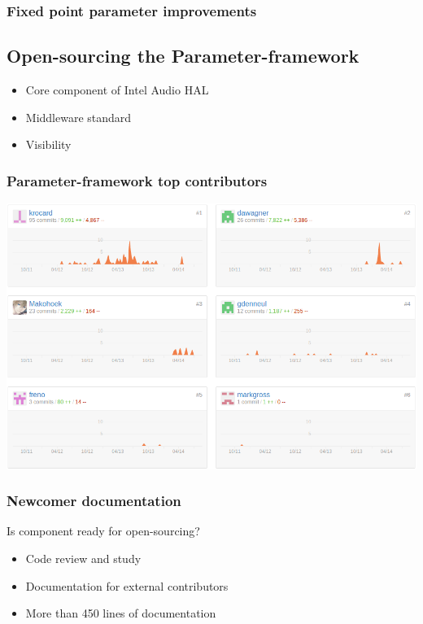 \begin{frame}
    \frametitle{Fixed point parameter improvements}
\end{frame}

\subsection{Open-sourcing the Parameter-framework}
\begin{FrameWithSubSection}
    \begin{itemize}
        \item Core component of Intel Audio HAL
        \item Middleware standard
        \item Visibility
    \end{itemize}
\end{FrameWithSubSection}

\begin{FrameWithSubSection}
    \frametitle{Parameter-framework top contributors}
    \centering
    \includegraphics[width=\textwidth]{../../report/src/img/statsGitHub.png}
\end{FrameWithSubSection}


\begin{FrameWithSubSection}
    \frametitle{Newcomer documentation}
    \centering
    \begin{block}{Is component ready for open-sourcing?}
        \begin{itemize}
            \item Code review and study
            \item Documentation for external contributors
            \item More than 450 lines of documentation
        \end{itemize}
    \end{block}
\end{FrameWithSubSection}

